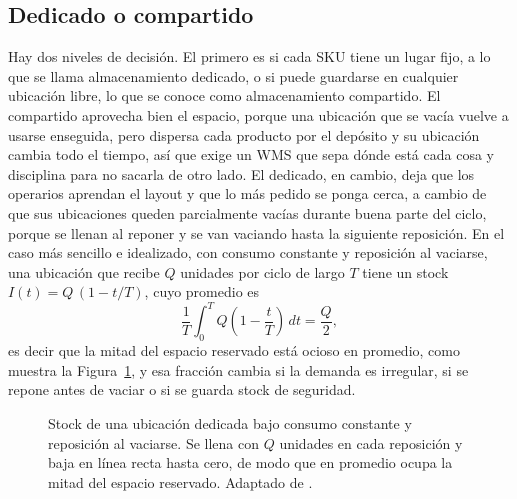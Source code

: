 \subsection{Dedicado o compartido}

Hay dos niveles de decisión.
El primero es si cada SKU tiene un lugar fijo, a lo que se llama almacenamiento dedicado, o si puede guardarse en cualquier ubicación libre, lo que se conoce como almacenamiento compartido.
El compartido aprovecha bien el espacio, porque una ubicación que se vacía vuelve a usarse enseguida, pero dispersa cada producto por el depósito y su ubicación cambia todo el tiempo, así que exige un WMS que sepa dónde está cada cosa y disciplina para no sacarla de otro lado.
El dedicado, en cambio, deja que los operarios aprendan el layout y que lo más pedido se ponga cerca, a cambio de que sus ubicaciones queden parcialmente vacías durante buena parte del ciclo, porque se llenan al reponer y se van vaciando hasta la siguiente reposición.
En el caso más sencillo e idealizado, con consumo constante y reposición al vaciarse, una ubicación que recibe $Q$ unidades por ciclo de largo $T$ tiene un stock $I(t) = Q\,(1 - t/T)$, cuyo promedio es
\begin{equation}
    \frac{1}{T}\int_0^T Q\left(1 - \frac{t}{T}\right)\,dt = \frac{Q}{2},
    \label{eq:diente-sierra}
\end{equation}
es decir que la mitad del espacio reservado está ocioso en promedio, como muestra la Figura~\ref{fig:diente-sierra}, y esa fracción cambia si la demanda es irregular, si se repone antes de vaciar o si se guarda stock de seguridad.

\begin{figure}[ht]
    \centering
    \caption{Stock de una ubicación dedicada bajo consumo constante y reposición al vaciarse. Se llena con $Q$ unidades en cada reposición y baja en línea recta hasta cero, de modo que en promedio ocupa la mitad del espacio reservado. Adaptado de \citet[capítulo~2]{bartholdi2014warehouse}.}
    \label{fig:diente-sierra}
\end{figure}


